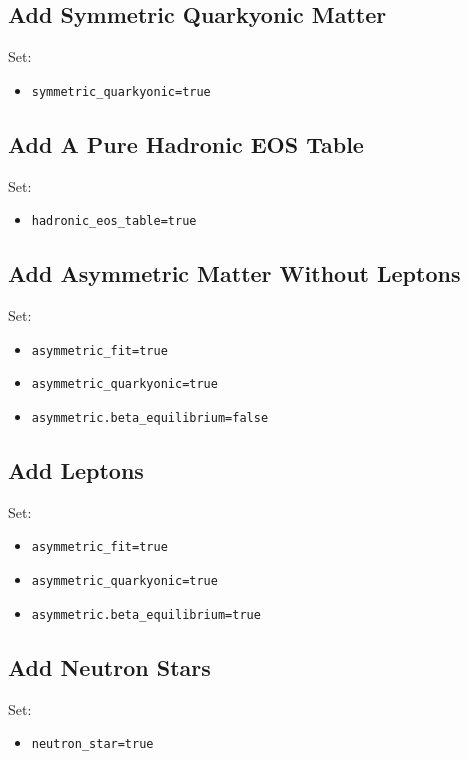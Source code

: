 \documentclass[11pt]{article}
\begin{document}
\subsection{Add Symmetric Quarkyonic Matter}

Set:
\begin{itemize}
\item \texttt{symmetric\_quarkyonic=true}
\end{itemize}

\subsection{Add A Pure Hadronic EOS Table}

Set:
\begin{itemize}
\item \texttt{hadronic\_eos\_table=true}
\end{itemize}

\subsection{Add Asymmetric Matter Without Leptons}

Set:
\begin{itemize}
\item \texttt{asymmetric\_fit=true}
\item \texttt{asymmetric\_quarkyonic=true}
\item \texttt{asymmetric.beta\_equilibrium=false}
\end{itemize}

\subsection{Add Leptons}

Set:
\begin{itemize}
\item \texttt{asymmetric\_fit=true}
\item \texttt{asymmetric\_quarkyonic=true}
\item \texttt{asymmetric.beta\_equilibrium=true}
\end{itemize}

\subsection{Add Neutron Stars}

Set:
\begin{itemize}
\item \texttt{neutron\_star=true}
\end{itemize}
\end{document}
